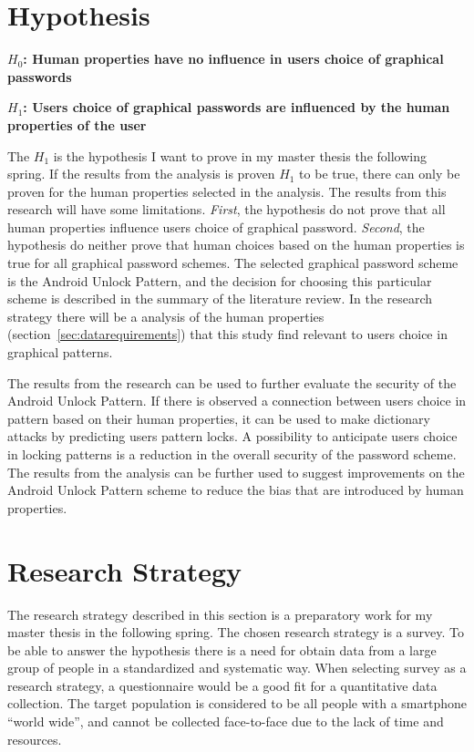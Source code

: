 \section{Hypothesis} \label{sec:hypothesis}
    
  {\bf $H_{0}$: Human properties have no influence in users choice of graphical passwords} 

  {\bf $H_{1}$: Users choice of graphical passwords are influenced by the human properties of the user}

  The $H_{1}$ is the hypothesis I want to prove in my master thesis the following spring. If the results from the analysis is proven $H_{1}$ to be true, there can only be proven for the human properties selected in the analysis. The results from this research will have some limitations. {\it First}, the hypothesis do not prove that all human properties influence users choice of graphical password. {\it Second}, the hypothesis do neither prove that human choices based on the human properties is true for all graphical password schemes. The selected graphical password scheme is the Android Unlock Pattern, and the decision for choosing this particular scheme is described in the summary of the literature review. In the research strategy there will be a analysis of the human properties (section~\ref{sec:datarequirements}) that this study find relevant to users choice in graphical patterns.

  The results from the research can be used to further evaluate the security of the Android Unlock Pattern. If there is observed a connection between users choice in pattern based on their human properties, it can be used to make dictionary attacks by predicting users pattern locks. A possibility to anticipate users choice in locking patterns is a reduction in the overall security of the password scheme. The results from the analysis can be further used to suggest improvements on the Android Unlock Pattern scheme to reduce the bias that are introduced by human properties.

\section{Research Strategy} \label{sec:researchstrategy}
  
  The research strategy described in this section is a preparatory work for my master thesis in the following spring. The chosen research strategy is a survey. To be able to answer the hypothesis there is a need for obtain data from a large group of people in a standardized and systematic way. When selecting survey as a research strategy, a questionnaire would be a good fit for a quantitative data collection. The target population is considered to be all people with a smartphone ``world wide'', and cannot be collected face-to-face due to the lack of time and resources. 

